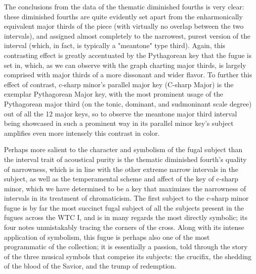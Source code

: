 The conclusions from the data of the thematic diminished fourths is very
clear: these diminished fourths are quite evidently set apart from the
enharmonically equivalent major thirds of the piece (with virtually no
overlap between the two intervals), and assigned almost completely to
the narrowest, purest version of the interval (which, in fact, is
typically a "meantone" type third). Again, this contrasting effect is
greatly accentuated by the Pythagorean key that the fugue is set in,
which, as we can observe with the graph charting major thirds, is
largely comprised with major thirds of a more dissonant and wider
flavor. To further this effect of contrast, c-sharp minor's parallel
major key (C-sharp Major) is the exemplar Pythagorean Major key, with
the most prominent usage of the Pythagorean major third (on the tonic,
dominant, and sudmoninant scale degree) out of all the 12 major keys, so
to observe the meantone major third interval being showcased in such a
prominent way in its parallel minor key's subject amplifies even more
intensely this contrast in color.

Perhaps more salient to the character and symbolism of the fugal subject
than the interval trait of acoustical purity is the thematic diminished
fourth's quality of narrowness, which is in line with the other extreme
narrow intervals in the subject, as well as the temperamental scheme and
affect of the key of c-sharp minor, which we have determined to be a key
that maximizes the narrowness of intervals in its treatment of
chromaticism. The first subject to the c-sharp minor fugue is by far the
most succinct fugal subject of all the subjects present in the fugues
across the WTC I, and is in many regards the most directly symbolic; its
four notes unmistakably tracing the corners of the cross. Along with its
intense application of symbolism, this fugue is perhaps also one of the
most programmatic of the collection; it is essentially a passion, told
through the story of the three musical symbols that comprise its
subjects: the crucifix, the shedding of the blood of the Savior, and the
trump of redemption.

